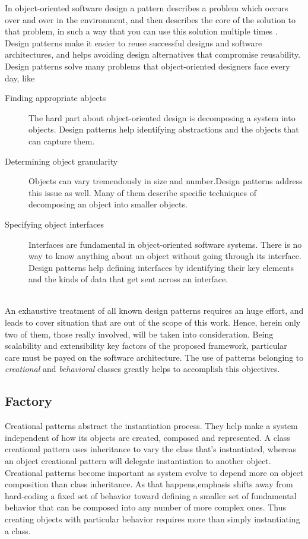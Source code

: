 In object-oriented software design a pattern describes a problem which occurs over and over in the environment, and then describes the core of the solution to that problem, in such a way that you can use this solution multiple times \citep{vlissides1995design}. Design patterns make it easier to reuse successful designs and software architectures, and helps avoiding design alternatives that compromise reusability.
\noindent
\\
Design patterns solve many problems that object-oriented designers face every day, like
\begin{description}
\item[Finding appropriate abjects] The hard part about object-oriented design is decomposing a system into objects. Design patterns help identifying abstractions and the objects that can capture them.
\item[Determining object granularity] Objects can vary tremendously in size and number.Design patterns address this issue as well. Many of them describe specific techniques of decomposing an object into smaller objects.
\item[Specifying object interfaces] Interfaces are fundamental in object-oriented software systems. There is no way to know anything about an object without going through its interface. Design patterns help defining interfaces by identifying their key elements and the kinds of data that get sent across an interface.
\end{description}
\noindent
\\
An exhaustive treatment of all known design patterns requires an huge effort, and leads to cover situation that are out of the scope of this work. Hence, herein only two of them, those really involved, will be taken into consideration. Being scalability and extensibility key factors of the proposed framework, particular care must be payed on the software architecture. The use of patterns belonging to \textit{creational} and \textit{behavioral} classes greatly helps to accomplish this objectives. 

\subsection{Factory}

Creational patterns abstract the instantiation process. They help make a system independent of how its objects are created, composed and represented. A class creational pattern uses inheritance to vary the class that's instantiated, whereas an object creational pattern will delegate instantiation to another object. Creational patterns become important as system evolve to depend more on object composition than class inheritance. As that happens,emphasis shifts away from hard-coding a fixed set of behavior toward defining a smaller set of fundamental behavior that can be composed into any number of more complex ones. Thus creating objects with particular behavior requires more than simply instantiating a class.
